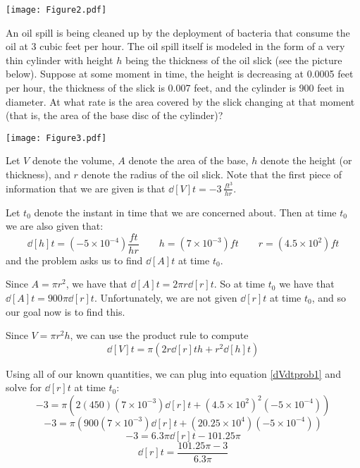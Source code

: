 \documentclass[nooutcomes]{ximera}
\begin{document}
	\begin{image}
	\texttt{[image: Figure2.pdf]}
	\end{image}

\begin{problem}
An oil spill is being cleaned up by the deployment of bacteria that consume the oil at 3 cubic feet per hour.  The oil spill itself is modeled in the form of a very thin cylinder with height $h$ being the thickness of the oil slick (see the picture below).  Suppose at some moment in time, the height is decreasing at 0.0005 feet per hour, the thickness of the slick is 0.007 feet, and the cylinder is 900 feet in diameter.  At what rate is the area covered by the slick changing at that moment (that is, the area of the base disc of the cylinder)?
	\begin{image}
	\texttt{[image: Figure3.pdf]}
	\end{image}
	
		\begin{freeResponse}
		Let $V$ denote the volume, $A$ denote the area of the base, $h$ denote the height (or thickness), and $r$ denote the radius of the oil slick.  Note that the first piece of information that we are given is that $\dd[V]{t} = -3 \, \frac{ft^3}{hr}$.  
		
		Let $t_0$ denote the instant in time that we are concerned about.  Then at time $t_0$ we are also given that:
		$$ \dd[h]{t} = \left( -5 \times 10^{-4} \right) \frac{ft}{hr}  \qquad  h = \left( 7 \times 10^{-3} \right) ft  \qquad  r = \left( 4.5 \times 10^2 \right) ft $$
		and the problem asks us to find $\dd[A]{t}$ at time $t_0$.  
		
		Since $A = \pi r^2$, we have that $\dd[A]{t} = 2 \pi r \dd[r]{t}$.  So at time $t_0$ we have that $\dd[A]{t} = 900 \pi \dd[r]{t}$.  Unfortunately, we are not given $\dd[r]{t}$ at time $t_0$, and so our goal now is to find this.
		
		Since $V = \pi r^2 h$, we can use the product rule to compute
		\begin{equation}\label{dVdtprob1}
		\dd[V]{t} = \pi \left( 2r \dd[r]{t} h + r^2 \dd[h]{t} \right)
		\end{equation}
		
		Using all of our known quantities, we can plug into equation \ref{dVdtprob1} and solve for $\dd[r]{t}$ at time $t_0$:
		$$ -3 = \pi \left( 2(450)(7 \times 10^{-3}) \dd[r]{t} + (4.5 \times 10^2)^2(-5 \times 10^{-4}) \right) $$
		$$ -3 = \pi \left( 900(7 \times 10^{-3}) \dd[r]{t} + (20.25 \times 10^4) (-5 \times 10^{-4}) \right) $$
		$$ -3 = 6.3 \pi \dd[r]{t} -101.25 \pi $$
		$$ \dd[r]{t} = \frac{101.25 \pi - 3}{6.3 \pi} $$
		

\end{freeResponse}
\end{problem}
\end{document}
